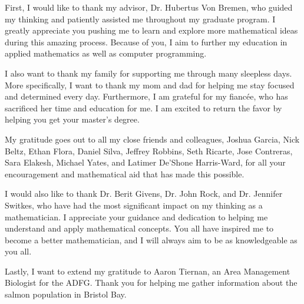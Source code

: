 First, I would like to thank my advisor, Dr. Hubertus Von Bremen, who guided my thinking and patiently assisted me throughout my graduate program.
I greatly appreciate you pushing me to learn and explore more mathematical ideas during this amazing process.
Because of you, I aim to further my education in applied mathematics as well as computer programming.

I also want to thank my family for supporting me through many sleepless days.
More specifically, I want to thank my mom and dad for helping me stay focused and determined every day.
Furthermore, I am grateful for my fianc\'{e}e, who has sacrificed her time and education for me.
I am excited to return the favor by helping you get your master's degree.

My gratitude goes out to all my close friends and colleagues, Joshua Garcia, Nick Beltz, Ethan Flora, Daniel Silva, Jeffrey Robbins, Seth Ricarte, Jose Contreras, Sara Elakesh, Michael Yates, and Latimer De'Shone Harris-Ward, for all your encouragement and mathematical aid that has made this possible.

I would also like to thank Dr. Berit Givens, Dr. John Rock, and Dr. Jennifer Switkes, who have had the most significant impact on my thinking as a mathematician.
I appreciate your guidance and dedication to helping me understand and apply mathematical concepts.
You all have inspired me to become a better mathematician, and I will always aim to be as knowledgeable as you all.

Lastly, I want to extend my gratitude to Aaron Tiernan, an Area Management Biologist for the ADFG. Thank you for helping me gather information about the salmon population in Bristol Bay.
